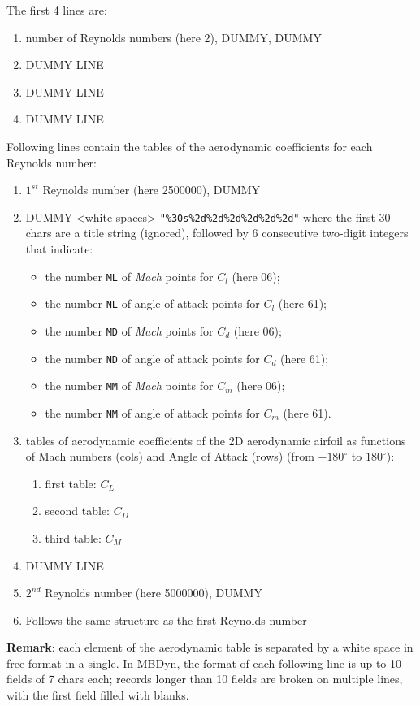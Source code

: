 The first 4 lines are:
\begin{enumerate}
  \item number of Reynolds numbers (here 2), DUMMY, DUMMY
  \item DUMMY LINE
  \item DUMMY LINE
  \item DUMMY LINE
\end{enumerate}
Following lines contain the tables of the aerodynamic coefficients for each Reynolds number: 
\begin{enumerate}
  \item $1^{st}$ Reynolds number (here 2500000), DUMMY
  \item DUMMY <white spaces> \texttt{"\%30s\%2d\%2d\%2d\%2d\%2d\%2d"} 
  where the first 30 chars are a title string (ignored), followed by 6 consecutive two-digit integers that indicate:
    \begin{itemize}
    \item the number \texttt{ML} of \emph{Mach} points for $C_l$ (here 06);
    \item the number \texttt{NL} of angle of attack points for $C_l$ (here 61);
    \item the number \texttt{MD} of \emph{Mach} points for $C_d$ (here 06);
    \item the number \texttt{ND} of angle of attack points for $C_d$ (here 61);
    \item the number \texttt{MM} of \emph{Mach} points for $C_m$ (here 06);
    \item the number \texttt{NM} of angle of attack points for $C_m$ (here 61).
    \end{itemize} 
  \item tables of aerodynamic coefficients of the 2D aerodynamic airfoil as functions of Mach numbers (cols) and Angle of Attack (rows) (from $-180^\circ$ to $180^\circ$): 
  \begin{enumerate}
    \item first table: $C_L$
    \item second table: $C_D$
    \item third table: $C_M$ 
  \end{enumerate}
  \item DUMMY LINE
  \item $2^{nd}$ Reynolds number (here 5000000), DUMMY
  \item Follows the same structure as the first Reynolds number   
\end{enumerate}
\textbf{Remark}: each element of the aerodynamic table is separated by a white space in free format in a single. 
In MBDyn, the format of each following line is up to 10 fields of 7 chars each;
records longer than 10 fields are broken on multiple lines, with the first field filled with blanks. 



